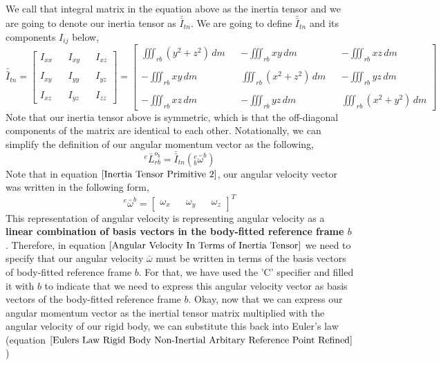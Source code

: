 We call that integral matrix in the equation above as the inertia tensor and we are going to denote our inertia tensor as $\bar{\bar{I}}_{tn}$.
We are going to define $\bar{\bar{I}}_{tn}$ and its components $I_{ij}$ below,
$$\bar{\bar{I}}_{tn} = \begin{bmatrix}
I_{xx} && I_{xy} && I_{xz} \\~\\
I_{xy} && I_{yy} && I_{yz} \\~\\
I_{xz} && I_{yz} && I_{zz}
\end{bmatrix} = \begin{bmatrix}
\iiint^{}_{rb} (y^{2}+z^{2}) \,dm && - \iiint^{}_{rb} xy \,dm &&  - \iiint^{}_{rb} xz \,dm \\~\\ 
-\iiint^{}_{rb} xy \,dm && \iiint^{}_{rb} (x^{2}+z^{2}) \,dm && -\iiint^{}_{rb} yz \,dm \\~\\
-\iiint^{}_{rb} xz \,dm && - \iiint^{}_{rb} yz \,dm && \iiint^{}_{rb} (x^{2}+y^{2}) \,dm 
\end{bmatrix}$$
Note that our inertia tensor above is symmetric, which is that the off-diagonal components of the matrix are identical to each other.
Notationally, we can simplify the definition of our angular momentum vector as the following,
\begin{equation}
{}^{e}\bar{L}^{o_{b}}_{rb} = \bar{\bar{I}}_{tn} ({}^{e}_{b}\bar{\omega}^{b})
\label{Angular Velocity In Terms of Inertia Tensor}
\end{equation}
Note that in equation $\ref{Inertia Tensor Primitive 2}$, our angular velocity vector was written in the following form,
$${}^{e}\bar{\omega}^{b} = \begin{bmatrix}\omega_{x} && \omega_{y} && \omega_{z}\end{bmatrix}^{T}$$
This representation of angular velocity is representing angular velocity as a \textbf{linear combination of basis vectors in the body-fitted reference frame $b$}.
Therefore, in equation $\ref{Angular Velocity In Terms of Inertia Tensor}$ we need to specify that our angular velocity $\bar{\omega}$ must be written in terms of the basis vectors of body-fitted reference frame $b$.
For that, we have used the 'C' specifier and filled it with $b$ to indicate that we need to express this angular velocity vector as basis vectors of the body-fitted reference frame $b$.
Okay, now that we can express our angular momentum vector as the inertial tensor matrix multiplied with the angular velocity of our rigid body, we can substitute this back into Euler's law (equation $\ref{Eulers Law Rigid Body Non-Inertial Arbitary Reference Point Refined}$)
